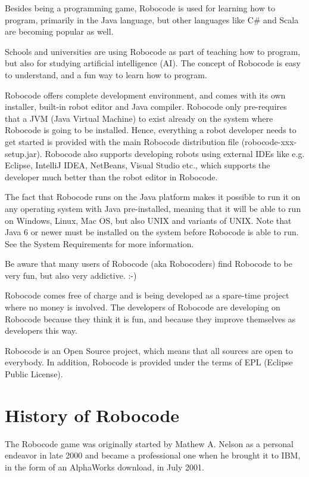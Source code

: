 \documentclass{scrreprt}
\begin{document}
Besides being a programming game, Robocode is used for learning how to program, primarily in the Java language, but other languages like C\# and Scala are becoming popular as well.

Schools and universities are using Robocode as part of teaching how to program, but also for studying artificial intelligence (AI). The concept of Robocode is easy to understand, and a fun way to learn how to program.

Robocode offers complete development environment, and comes with its own installer, built-in robot editor and Java compiler. Robocode only pre-requires that a JVM (Java Virtual Machine) to exist already on the system where Robocode is going to be installed. Hence, everything a robot developer needs to get started is provided with the main Robocode distribution file (robocode-xxx-setup.jar). Robocode also supports developing robots using external IDEs like e.g. Eclipse, IntelliJ IDEA, NetBeans, Visual Studio etc., which supports the developer much better than the robot editor in Robocode.

The fact that Robocode runs on the Java platform makes it possible to run it on any operating system with Java pre-installed, meaning that it will be able to run on Windows, Linux, Mac OS, but also UNIX and variants of UNIX. Note that Java 6 or newer must be installed on the system before Robocode is able to run. See the System Requirements for more information.

Be aware that many users of Robocode (aka Robocoders) find Robocode to be very fun, but also very addictive. :-)

Robocode comes free of charge and is being developed as a spare-time project where no money is involved. The developers of Robocode are developing on Robocode because they think it is fun, and because they improve themselves as developers this way.

Robocode is an Open Source project, which means that all sources are open to everybody. In addition, Robocode is provided under the terms of EPL (Eclipse Public License).

\section{History of Robocode}
The Robocode game was originally started by Mathew A. Nelson as a personal endeavor in late 2000 and became a professional one when he brought it to IBM, in the form of an AlphaWorks download, in July 2001.
\end{document}
